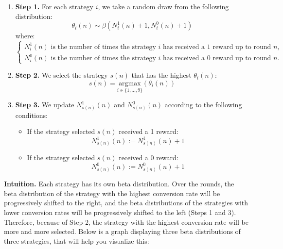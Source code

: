 \documentclass[]{book}
\begin{document}
\begin{enumerate}

    \item \textbf{Step 1.} For each strategy $i$, we take a random draw from the following distribution:
    \begin{equation*}
        \theta_i(n) \sim \beta(N_i^1(n)+1,N_i^0(n)+1)
    \end{equation*}
    where:
    \begin{equation*}
        \begin{cases}
            \textrm{$N_i^1(n)$ is the number of times the strategy $i$ has received a 1 reward up to round $n$,} \\
            \textrm{$N_i^0(n)$ is the number of times the strategy $i$ has received a 0 reward up to round $n$.}
        \end{cases}
    \end{equation*}
    
    \item \textbf{Step 2.} We select the strategy $s(n)$ that has the highest $\theta_i(n)$:
    \begin{equation*}
        s(n) = \underset{i\in\{1,...,9\}}{\textrm{argmax}}(\theta_i(n))
    \end{equation*}
    
    \item \textbf{Step 3.} We update $N_{s(n)}^1(n)$ and $N_{s(n)}^0(n)$ according to the following conditions:
    \begin{itemize}
        \item If the strategy selected $s(n)$ received a 1 reward:
        \begin{equation*}
            N_{s(n)}^1(n) := N_{s(n)}^1(n) + 1
        \end{equation*}
        \item If the strategy selected $s(n)$ received a 0 reward:
        \begin{equation*}
            N_{s(n)}^0(n) := N_{s(n)}^0(n) + 1
        \end{equation*}
    \end{itemize}

\end{enumerate}

\textbf{Intuition.} Each strategy has its own beta distribution. Over the rounds, the beta distribution of the strategy with the highest conversion rate will be progressively shifted to the right, and the beta distributions of the strategies with lower conversion rates will be progressively shifted to the left (Steps 1 and 3). Therefore, because of Step 2, the strategy with the highest conversion rate will be more and more selected. Below is a graph displaying three beta distributions of three strategies, that will help you visualize this:
\end{document}
